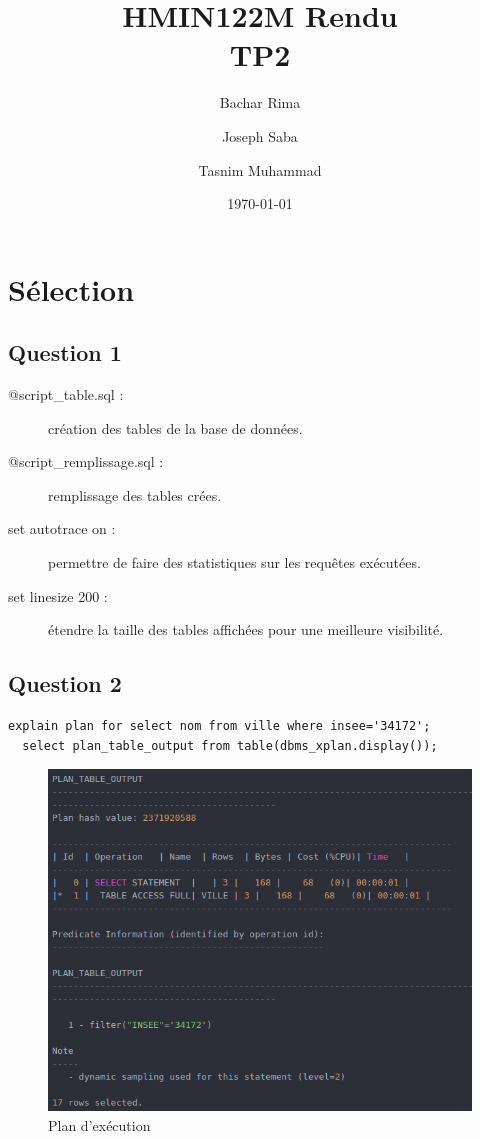 \documentclass[a4paper,12pt]{article}
\title{
  HMIN122M Rendu \\
  \large TP2
}
\author{Bachar Rima \and Joseph Saba \and Tasnim Muhammad}
\date{\today}
\begin{document}
\pagestyle{plain}

\maketitle

{
  \hypersetup{linkcolor=black}
  \tableofcontents
}

\section{Sélection}
\subsection{Question 1}
\begin{description}
  \item [@script\_table.sql :] création des tables de la base de données.
  \item [@script\_remplissage.sql :] remplissage des tables crées.
  \item [set autotrace on :] permettre de faire des statistiques sur les requêtes exécutées.
  \item [set linesize 200 :] étendre la taille des tables affichées pour une meilleure visibilité.
\end{description}

\subsection{Question 2}
\begin{lstlisting}[caption={plan d'exécution choisi par l'optimiseur pour la requête permettant d'afficher le nom des villes dont le numéro insee est 34172}]
  explain plan for select nom from ville where insee='34172';
  select plan_table_output from table(dbms_xplan.display());
\end{lstlisting}

\begin{figure}[!ht]
  \centering
  \includegraphics[scale=0.6]{images/q2_1.png}
  \caption{Plan d'exécution}
\end{figure}
\end{document}

